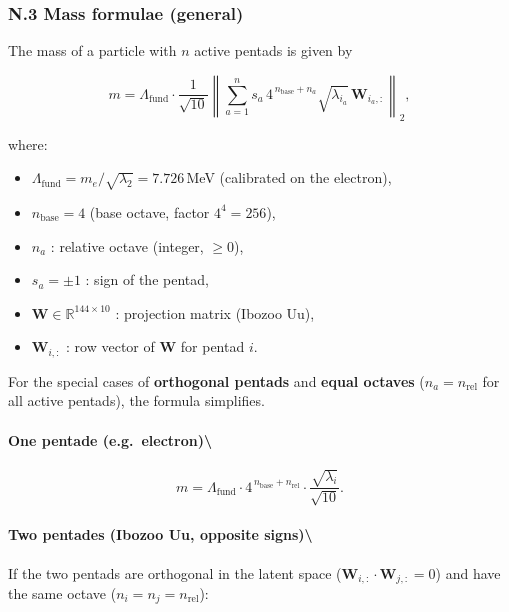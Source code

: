 \documentclass[11pt]{article}
\providecommand{\tightlist}{\setlength{\itemsep}{2pt}\setlength{\parskip}{6pt}}
\providecommand{\tightlist}{%
  \setlength{\itemsep}{2pt}\setlength{\parskip}{6pt}
}
\begin{document}
\hypertarget{n.3-mass-formulae-general}{%
\subsubsection{N.3 Mass formulae
(general)}\label{n.3-mass-formulae-general}}

The mass of a particle with \(n\) active pentads is given by

\[
m = \Lambda_{\text{fund}} \cdot \frac{1}{\sqrt{10}} \left\| \sum_{a=1}^{n} s_a \, 4^{\,n_{\text{base}} + n_a} \sqrt{\lambda_{i_a}} \, \mathbf{W}_{i_a,:} \right\|_2,
\]

where:

\begin{itemize}
\tightlist
\item
  \(\Lambda_{\text{fund}} = m_e / \sqrt{\lambda_2} = 7.726\)\,MeV
  (calibrated on the electron),
\item
  \(n_{\text{base}} = 4\) (base octave, factor \(4^{4}=256\)),
\item
  \(n_a\) : relative octave (integer, \(\ge 0\)),
\item
  \(s_a = \pm 1\) : sign of the pentad,
\item
  \(\mathbf{W} \in \mathbb{R}^{144\times 10}\) : projection matrix
  (Ibozoo Uu),
\item
  \(\mathbf{W}_{i,:}\) : row vector of \(\mathbf{W}\) for pentad \(i\).
\end{itemize}

For the special cases of \textbf{orthogonal pentads} and \textbf{equal
octaves} (\(n_a = n_{\text{rel}}\) for all active pentads), the formula
simplifies.

\hypertarget{one-pentade-e.g.-electron}{%
\paragraph{One pentade
(e.g.~electron)\textbackslash{}}\label{one-pentade-e.g.-electron}}

\[
m = \Lambda_{\text{fund}} \cdot 4^{\,n_{\text{base}} + n_{\text{rel}}} \cdot \frac{\sqrt{\lambda_i}}{\sqrt{10}}.
\]

\hypertarget{two-pentades-ibozoo-uu-opposite-signs}{%
\paragraph{Two pentades (Ibozoo Uu, opposite
signs)\textbackslash{}}\label{two-pentades-ibozoo-uu-opposite-signs}}

If the two pentads are orthogonal in the latent space
(\(\mathbf{W}_{i,:} \cdot \mathbf{W}_{j,:} = 0\)) and have the same
octave (\(n_i = n_j = n_{\text{rel}}\)):
\end{document}
